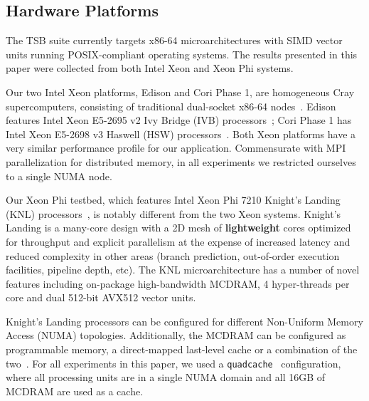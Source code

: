 \documentclass[10pt, conference, compsocconf]{IEEEtran}
\begin{document}
\subsection{Hardware Platforms}
\label{sec:setup:hardware_platforms}

The TSB suite currently targets x86-64 microarchitectures with SIMD vector units
  running POSIX-compliant operating systems.
The results presented in this paper were collected from both Intel Xeon and
  Xeon Phi systems.

Our two Intel Xeon platforms, Edison and Cori Phase 1, are homogeneous Cray
  supercomputers, consisting of traditional dual-socket x86-64
  nodes~\cite{nersc_systems}.
Edison features Intel Xeon E5-2695 v2 Ivy Bridge
  (IVB) processors~\cite{intel_ark_xeon_e5_2695_v2}; Cori Phase 1 has Intel
  Xeon E5-2698 v3 Haswell (HSW) processors~\cite{intel_ark_xeon_e5_2698_v3}.
Both Xeon platforms have a very similar performance profile for
  our application.
Commensurate with MPI parallelization for distributed memory, in all experiments
  we restricted ourselves to a single NUMA node.

Our Xeon Phi testbed, which features Intel Xeon Phi 7210 Knight's Landing
  (KNL) processors~\cite{intel_ark_xeon_phi_7210}, is notably different from
  the two Xeon systems.
Knight's Landing is a many-core design with a 2D mesh of \textbf{lightweight}
  cores optimized for throughput and explicit parallelism at the expense of
  increased latency and reduced complexity in other areas (branch prediction,
  out-of-order execution facilities, pipeline depth, etc).
The KNL microarchitecture has a number of novel features including on-package
  high-bandwidth MCDRAM, 4 hyper-threads per core and dual 512-bit
  AVX512 vector units.~\cite{roofline_knl,knl_sodani}

Knight's Landing processors can be configured for different Non-Uniform Memory
  Access (NUMA) topologies.
Additionally, the MCDRAM can be configured as programmable memory, a
  direct-mapped last-level cache or a combination of the
  two~\cite{knl_sodani}.
For all experiments in this paper, we used a
  \lstinline{quadcache}~\cite{roofline_knl} configuration, where all processing
  units are in a single NUMA domain and all 16GB of MCDRAM are used as a cache.
\end{document}
